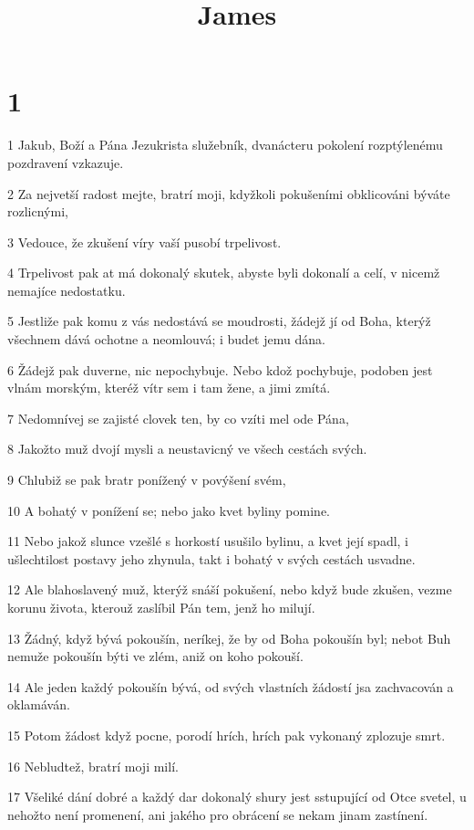 

\title{James}

\chapter{1}

\par 1 Jakub, Boží a Pána Jezukrista služebník, dvanácteru pokolení rozptýlenému pozdravení vzkazuje.
\par 2 Za nejvetší radost mejte, bratrí moji, kdyžkoli pokušeními obklicováni býváte rozlicnými,
\par 3 Vedouce, že zkušení víry vaší pusobí trpelivost.
\par 4 Trpelivost pak at má dokonalý skutek, abyste byli dokonalí a celí, v nicemž nemajíce nedostatku.
\par 5 Jestliže pak komu z vás nedostává se moudrosti, žádejž jí od Boha, kterýž všechnem dává ochotne a neomlouvá; i budet jemu dána.
\par 6 Žádejž pak duverne, nic nepochybuje. Nebo kdož pochybuje, podoben jest vlnám morským, kteréž vítr sem i tam žene, a jimi zmítá.
\par 7 Nedomnívej se zajisté clovek ten, by co vzíti mel ode Pána,
\par 8 Jakožto muž dvojí mysli a neustavicný ve všech cestách svých.
\par 9 Chlubiž se pak bratr ponížený v povýšení svém,
\par 10 A bohatý v ponížení se; nebo jako kvet byliny pomine.
\par 11 Nebo jakož slunce vzešlé s horkostí usušilo bylinu, a kvet její spadl, i ušlechtilost postavy jeho zhynula, takt i bohatý v svých cestách usvadne.
\par 12 Ale blahoslavený muž, kterýž snáší pokušení, nebo když bude zkušen, vezme korunu života, kterouž zaslíbil Pán tem, jenž ho milují.
\par 13 Žádný, když bývá pokoušín, neríkej, že by od Boha pokoušín byl; nebot Buh nemuže pokoušín býti ve zlém, aniž on koho pokouší.
\par 14 Ale jeden každý pokoušín bývá, od svých vlastních žádostí jsa zachvacován a oklamáván.
\par 15 Potom žádost když pocne, porodí hrích, hrích pak vykonaný zplozuje smrt.
\par 16 Nebludtež, bratrí moji milí.
\par 17 Všeliké dání dobré a každý dar dokonalý shury jest sstupující od Otce svetel, u nehožto není promenení, ani jakého pro obrácení se nekam jinam zastínení.
